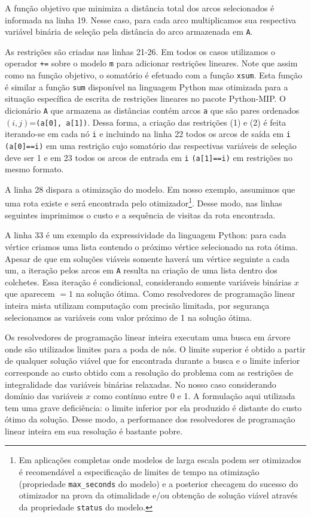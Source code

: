 \documentclass[a4paper,11pt,fleqn]{article}
\begin{document}
A função objetivo que minimiza a distância total dos arcos selecionados é informada na linha 19. Nesse caso, para cada arco multiplicamos sua respectiva variável binária de seleção pela distância do arco armazenada em \texttt{A}.

As restrições são criadas nas linhas 21-26. Em todos os casos utilizamos o operador \texttt{+=} sobre o modelo \texttt{m} para adicionar restrições lineares. Note que assim como na função objetivo, o somatório é efetuado com a função \texttt{xsum}. Esta função é similar a função \texttt{sum} disponível na linguagem Python mas otimizada para a situação específica de escrita de restrições lineares no pacote Python-MIP\@. O dicionário \texttt{A} que armazena as distâncias contém arcos \texttt{a} que são pares ordenados $(i,j)$=\texttt{(a[0], a[1])}. Dessa forma, a criação das restrições (1) e (2) é feita iterando-se em cada nó \texttt{i} e incluindo na linha 22 todos os arcos de saída em \texttt{i} \texttt{(a[0]==i)} em uma restrição cujo somatório das respectivas variáveis de seleção deve ser 1 e em 23 todos os arcos de entrada em \texttt{i} \texttt{(a[1]==i)} em restrições no mesmo formato.

A linha 28 dispara a otimização do modelo. Em nosso exemplo, assumimos que uma rota existe e será encontrada pelo otimizador\footnote{Em aplicações completas onde modelos de larga escala podem ser otimizados é recomendável a especificação de limites de tempo na otimização (propriedade \texttt{max\_seconds} do modelo) e a posterior checagem do sucesso do otimizador na prova da otimalidade e/ou obtenção de solução viável através da propriedade \texttt{status} do modelo.}. Desse modo, nas linhas seguintes imprimimos o custo e a sequência de visitas da rota encontrada. 

A linha 33 é um exemplo da expressividade da linguagem Python: para cada vértice criamos uma lista contendo o próximo vértice selecionado na rota ótima. Apesar de que em soluções viáveis somente haverá um vértice seguinte a cada um, a iteração pelos arcos em \texttt{A} resulta na criação de uma lista dentro dos colchetes. Essa iteração é condicional, considerando somente variáveis binárias $x$ que aparecem $=1$ na solução ótima. Como resolvedores de programação linear inteira mista utilizam computação com precisão limitada, por segurança selecionamos as variáveis com valor próximo de 1 na solução ótima. 

Os resolvedores de programação linear inteira executam uma busca em árvore onde são utilizados limites para a poda de nós. O limite superior é obtido a partir de qualquer solução viável que for encontrada durante a busca e o limite inferior corresponde ao custo obtido com a resolução do problema com as restrições de integralidade das variáveis binárias relaxadas. No nosso caso considerando domínio das variáveis $x$ como contínuo entre 0 e 1. A formulação aqui utilizada tem uma grave deficiência: o limite inferior por ela produzido é distante do custo ótimo da solução. Desse modo, a performance dos resolvedores de programação linear inteira em sua resolução é bastante pobre. 
\end{document}
